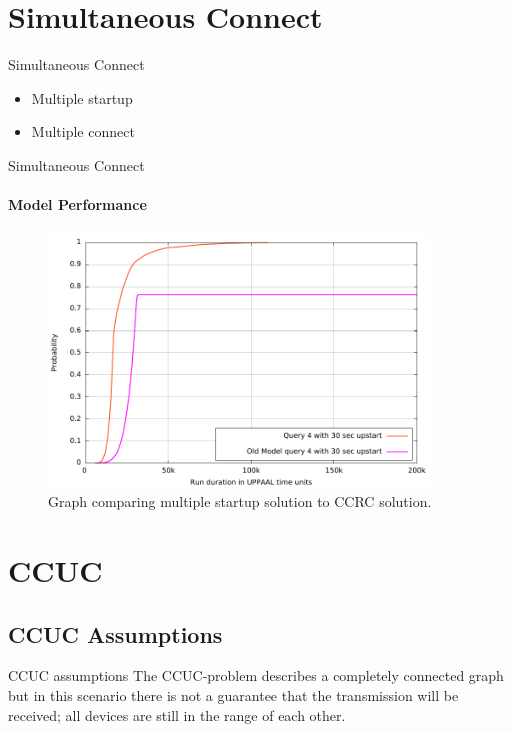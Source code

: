 \section{Simultaneous Connect}
\begin{frame}{Simultaneous Connect}
  \begin{itemize}
    \item Multiple startup
    \item Multiple connect
  \end{itemize}
\end{frame}

\begin{frame}{Simultaneous Connect}
\framesubtitle{Model Performance}
  \begin{figure}[ht]
  \includegraphics[width=0.9\textwidth]{images/graph.pdf} 
\caption{Graph comparing multiple startup solution to CCRC solution.}
\label{fig:ConnectQueryTime}
\end{figure}
\end{frame}

\section{CCUC}
\subsection{CCUC Assumptions}
\begin{frame}{CCUC assumptions}
The CCUC-problem describes a completely connected graph but in this scenario there is not a guarantee that the transmission will be received; all devices are still in the range of each other.
\end{frame}

